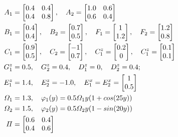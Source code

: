 \begin{equation} \notag
\begin{aligned}
A_{1}&=\begin{bmatrix}
0.4&0.4\\
0.4&0.8
\end{bmatrix}, \quad
A_{2}=\begin{bmatrix}
1.0&0.6\\
0.6&0.4
\end{bmatrix}\\     
B_{1}&=\begin{bmatrix}
0.4\\0.4
\end{bmatrix}, \quad
B_2 = \begin{bmatrix}
0.7\\0.5
\end{bmatrix}, \quad
F_{1}=\begin{bmatrix}
1\\1.2
\end{bmatrix},\quad
F_{2}=\begin{bmatrix}
1.2\\0.8
\end{bmatrix}
\\
C_{1}&=\begin{bmatrix}
0.9\\0.5
\end{bmatrix},\quad
C_{2}=\begin{bmatrix}
-1\\0.7
\end{bmatrix},\quad
C^{z}_{1}=\begin{bmatrix}
0.2\\0
\end{bmatrix},\quad
C^{z}_{1}=\begin{bmatrix}
0.1\\0.1
\end{bmatrix} \\       
G^{z}_{1}& = 0.5,\quad G^{z}_{2} = 0.4,\quad D^{z}_{1} = 0,\quad D^{z}_{2} = 0.4;\\
E^{z}_{1}&= 1.4,\quad E^{z}_{2} = -1.0,\quad 	E^{x}_{1} = E^{x}_{2}= \begin{bmatrix} 
1\\0.5
\end{bmatrix}\\
\varOmega_{1}&=1.3, \quad \varphi_{1}(y)=0.5\varOmega_{1}y(1+cos(25y)) \\ 
\varOmega_{2}&=1.5,\quad \varphi_{2}(y)=0.5\varOmega_{2}y(1-sin(20y)) \\
\varPi&=\begin{bmatrix}
0.6&0.4\\
0.4&0.6
\end{bmatrix}
\end{aligned}  
\end{equation}



